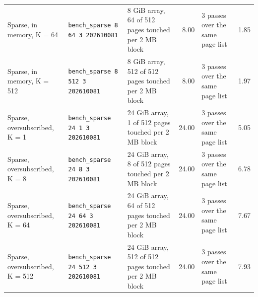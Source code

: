 \begin{tabular}{@{}lp{1.35in}p{1.65in}rp{0.95in}r@{}}
Sparse, in memory, K = 64 & \texttt{bench\_\allowbreak{}sparse 8 64 3 202610081} & 8 GiB array, 64 of 512 pages touched per 2 MB block & 8.00 & 3 passes over the same page list & 1.85 \\ %
Sparse, in memory, K = 512 & \texttt{bench\_\allowbreak{}sparse 8 512 3 202610081} & 8 GiB array, 512 of 512 pages touched per 2 MB block & 8.00 & 3 passes over the same page list & 1.97 \\ %
Sparse, oversubscribed, K = 1 & \texttt{bench\_\allowbreak{}sparse 24 1 3 202610081} & 24 GiB array, 1 of 512 pages touched per 2 MB block & 24.00 & 3 passes over the same page list & 5.05 \\ %
Sparse, oversubscribed, K = 8 & \texttt{bench\_\allowbreak{}sparse 24 8 3 202610081} & 24 GiB array, 8 of 512 pages touched per 2 MB block & 24.00 & 3 passes over the same page list & 6.78 \\ %
Sparse, oversubscribed, K = 64 & \texttt{bench\_\allowbreak{}sparse 24 64 3 202610081} & 24 GiB array, 64 of 512 pages touched per 2 MB block & 24.00 & 3 passes over the same page list & 7.67 \\ %
Sparse, oversubscribed, K = 512 & \texttt{bench\_\allowbreak{}sparse 24 512 3 202610081} & 24 GiB array, 512 of 512 pages touched per 2 MB block & 24.00 & 3 passes over the same page list & 7.93 \\ %
\bottomrule
\end{tabular}
